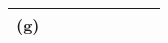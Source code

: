 \begin{table}[]
\begin{tabular}{|c|l|l|l|l|l|l|l|l|l|}
(g)                             &                                                 &                                         &                                         &                                         & \cellcolor[HTML]{C0C0C0}               & \cellcolor[HTML]{C0C0C0}                & \multicolumn{3}{l|}{\multirow{-9}{*}{}}                                                                                  \\ \hline
\end{tabular}
\end{table}
